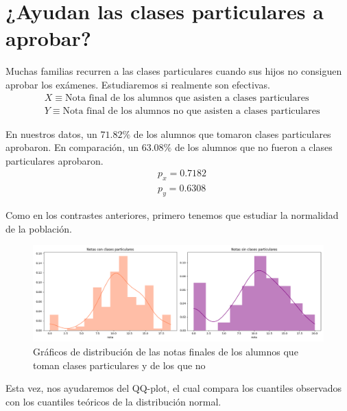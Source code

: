 \section{¿Ayudan las clases particulares a aprobar?}

Muchas familias recurren a las clases particulares cuando sus hijos no consiguen aprobar los exámenes. Estudiaremos si realmente son efectivas.
\begin{equation*}
    \begin{split}
        & X \equiv \text{Nota final de los alumnos que asisten a clases particulares}\\
        & Y \equiv \text{Nota final de los alumnos no que asisten a clases particulares}
    \end{split}
\end{equation*}

En nuestros datos, un $71.82\%$ de los alumnos que tomaron clases particulares aprobaron. En comparación, un $63.08\%$ de los alumnos que no fueron a clases particulares aprobaron.
\begin{equation*}
    \begin{split}
        & p_{x} = 0.7182\\
        & p_{y} = 0.6308
    \end{split}
\end{equation*}

Como en los contrastes anteriores, primero tenemos que estudiar la normalidad de la población.

\begin{figure}[H]
    \begin{center}
        \includegraphics[width=1\textwidth]{figures/dist-notas-clases-particulares.png}
    \end{center}
    \caption{Gráficos de distribución de las notas finales de los alumnos que toman clases particulares y de los que no}
    \label{fig:dist-notas-clases-particulares}
\end{figure}

Esta vez, nos ayudaremos del QQ-plot, el cual compara los cuantiles observados con los cuantiles teóricos de la distribución normal.

